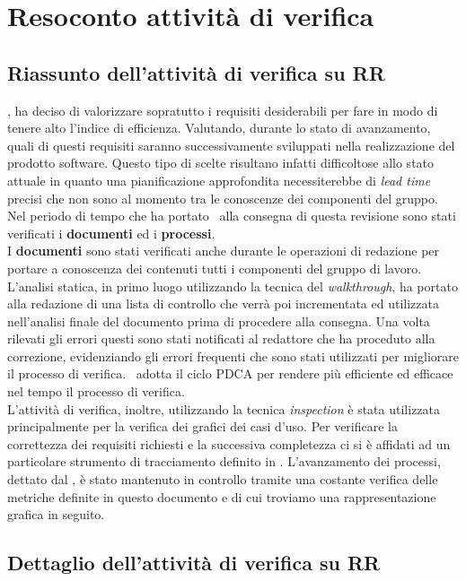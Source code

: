 \section{Resoconto attività di verifica}
\subsection{Riassunto dell'attività di verifica su RR}
\gruppo, ha deciso di valorizzare sopratutto i requisiti desiderabili per fare in modo di tenere alto l'indice di efficienza. Valutando, durante lo stato di avanzamento, quali di questi requisiti saranno successivamente sviluppati nella realizzazione del prodotto software. Questo tipo di scelte risultano infatti difficoltose allo stato attuale in quanto una pianificazione approfondita necessiterebbe di \textit{lead time}  precisi che non sono al momento tra le conoscenze dei componenti del gruppo.
Nel periodo di tempo che ha portato \gruppo ~alla consegna di questa revisione sono stati verificati i \textbf{documenti} ed i \textbf{processi}.\\
I \textbf{documenti} sono stati verificati anche durante le operazioni di redazione per portare a conoscenza dei contenuti tutti i componenti del gruppo di lavoro.
L'analisi statica, in primo luogo utilizzando la tecnica del \textit{walkthrough}, ha portato alla redazione  di una lista di controllo che verrà poi incrementata ed utilizzata nell'analisi finale del documento prima di procedere alla consegna. Una volta rilevati gli errori questi sono stati notificati al redattore che ha proceduto alla correzione, evidenziando gli errori frequenti che sono stati utilizzati per migliorare il processo di verifica. \gruppo ~adotta il ciclo PDCA per rendere più efficiente ed efficace nel tempo il processo di verifica.\\
L'attività di verifica, inoltre, utilizzando la tecnica \textit{inspection} è stata utilizzata principalmente per la verifica dei grafici dei casi d'uso. Per verificare la correttezza dei requisiti richiesti e la successiva completezza ci si è affidati ad un particolare strumento di tracciamento definito in \infoNDP.
L'avanzamento dei processi, dettato dal \infoPDP, è stato mantenuto in controllo tramite una costante verifica delle metriche definite in questo documento e di cui troviamo una rappresentazione grafica in seguito.
\subsection{Dettaglio dell'attività di verifica su RR}
